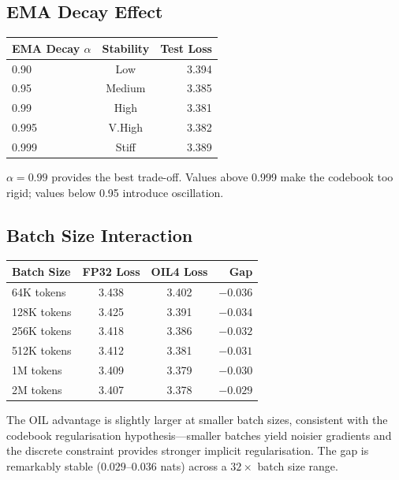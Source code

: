 \subsection{EMA Decay Effect}
\begin{center}
\begin{tabular}{lcr}
\toprule
\textbf{EMA Decay $\alpha$} & \textbf{Stability} & \textbf{Test Loss} \\
\midrule
0.90  & Low    & 3.394 \\
0.95  & Medium & 3.385 \\
0.99  & High   & 3.381 \\
0.995 & V.High & 3.382 \\
0.999 & Stiff  & 3.389 \\
\bottomrule
\end{tabular}
\end{center}
\begin{table}[h]
\centering
\caption{EMA decay effect on codebook stability and training quality (64M model).}
\label{tab:ablation_ema}
\end{table}
$\alpha = 0.99$ provides the best trade-off. Values above 0.999 make the codebook too rigid;
values below 0.95 introduce oscillation.
\subsection{Batch Size Interaction}
\begin{center}
\begin{tabular}{lccr}
\toprule
\textbf{Batch Size} & \textbf{FP32 Loss} & \textbf{OIL4 Loss} & \textbf{Gap} \\
\midrule
64K tokens   & 3.438 & 3.402 & $-0.036$ \\
128K tokens  & 3.425 & 3.391 & $-0.034$ \\
256K tokens  & 3.418 & 3.386 & $-0.032$ \\
512K tokens  & 3.412 & 3.381 & $-0.031$ \\
1M tokens    & 3.409 & 3.379 & $-0.030$ \\
2M tokens    & 3.407 & 3.378 & $-0.029$ \\
\bottomrule
\end{tabular}
\end{center}
\begin{table}[h]
\centering
\caption{OIL4 advantage over FP32 vs.\ batch size (64M model).}
\label{tab:ablation_batch}
\end{table}
The OIL advantage is slightly larger at smaller batch sizes, consistent with the codebook
regularisation hypothesis---smaller batches yield noisier gradients and the discrete
constraint provides stronger implicit regularisation. The gap is remarkably stable
($0.029$--$0.036$ nats) across a $32\times$ batch size range.
